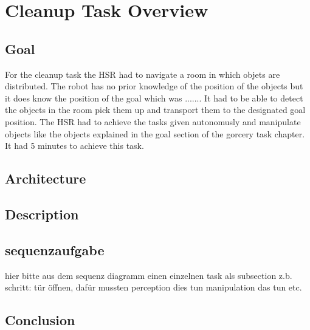 \documentclass[main.tex]{subfiles}
\begin{document}
	\begingroup

	\renewcommand{\cleardoublepage}{}

	\renewcommand{\clearpage}{}

	\chapter{Cleanup Task Overview}

		
		\section{Goal}
		For the cleanup task the HSR had to navigate a room in which objets are distributed. The robot has no prior knowledge of the position of the objects but it does know the position of the goal which was ....... It had to be able to detect the objects in the room pick them up and transport them to the designated goal position. The HSR had to achieve the tasks given autonomusly and manipulate objects like the objects explained in the goal section of the gorcery task chapter. It had 5 minutes to achieve this task.
		
		\section{Architecture}
		
		\section{Description}
	  	
	  	\section{sequenzaufgabe}
		hier bitte aus dem sequenz diagramm einen einzelnen task als subsection z.b. schritt: tür öffnen, dafür mussten perception dies tun manipulation das tun etc.
		
		\section{Conclusion}
		
		
	\endgroup
\end{document}
